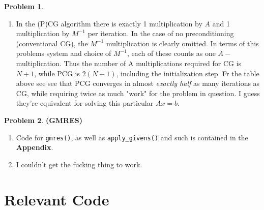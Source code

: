 \documentclass[10pt]{article}
\theoremstyle{definition}
\newtheorem{prob}{Problem}
\begin{document}
\begin{prob}
\begin{enumerate}[\bfseries(a)]
\begin{table}[h]
\begin{center}
\begin{tabular}{|c|c|c|c|}
\end{tabular}\end{center}
\caption{Iteration counts for the problem $Ax=b$ in Problem 2(b).}
\end{table}
\item In the (P)CG algorithm there is exactly 1 multiplication by $A$ and 1 multiplication by $M^{-1}$ per iteration. In the case of no preconditioning (conventional CG), the $M^{-1}$ multiplication is clearly omitted. In terms of this problems system and choice of $M^{-1}$, each of these counts as one $A-$multiplication. Thus the number of A multiplications required for  CG is $N+1$, while PCG is $2(N+1)$, including the initialization step. Fr the table above see see that PCG converges in almost \textit{exactly half} as many iterations as CG, while requiring twice as much "work" for the problem in question. I guess they're equivalent for solving this particular $Ax=b$.
\end{enumerate}
\end{prob}
\begin{prob}{\textbf{(GMRES)}}
\begin{enumerate}[\bfseries(a)]
\item Code for \texttt{gmres()}, as well as \texttt{apply\_givens()} and such is contained in the \textbf{Appendix}.
\item I couldn't get the fucking thing to work.
\end{enumerate}
\end{prob}

\appendix
\section{Relevant Code}


\end{document}
